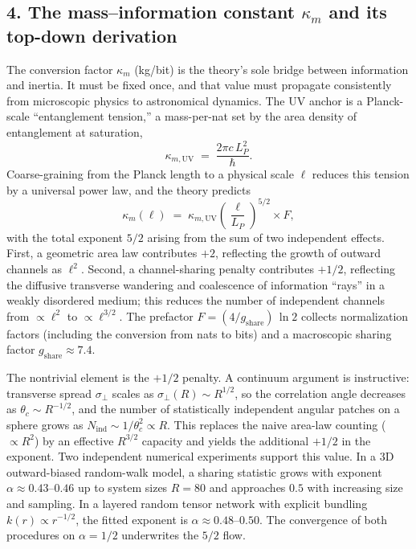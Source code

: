 \documentclass[11pt]{article}
\begin{document}
\subsection*{4. The mass–information constant $\kappa_m$ and its top-down derivation}

The conversion factor $\kappa_m$ (kg/bit) is the theory’s sole bridge between information and inertia. It must be fixed once, and that value must propagate consistently from microscopic physics to astronomical dynamics. The UV anchor is a Planck-scale “entanglement tension,” a mass-per-nat set by the area density of entanglement at saturation,
\begin{equation}
\kappa_{m,\mathrm{UV}} \;=\; \frac{2\pi c\, L_P^2}{\hbar}.
\end{equation}
Coarse-graining from the Planck length to a physical scale $\ell$ reduces this tension by a universal power law, and the theory predicts
\begin{equation}
\kappa_m(\ell) \;=\; \kappa_{m,\mathrm{UV}} \left(\frac{\ell}{L_P}\right)^{5/2} \times F,
\end{equation}
with the total exponent $5/2$ arising from the sum of two independent effects. First, a geometric area law contributes $+2$, reflecting the growth of outward channels as $\ell^2$. Second, a channel-sharing penalty contributes $+1/2$, reflecting the diffusive transverse wandering and coalescence of information “rays” in a weakly disordered medium; this reduces the number of independent channels from $\propto \ell^2$ to $\propto \ell^{3/2}$. The prefactor $F = (4 / g_{\mathrm{share}})\, \ln 2$ collects normalization factors (including the conversion from nats to bits) and a macroscopic sharing factor $g_{\mathrm{share}} \approx 7.4$.

The nontrivial element is the $+1/2$ penalty. A continuum argument is instructive: transverse spread $\sigma_\perp$ scales as $\sigma_\perp(R) \sim R^{1/2}$, so the correlation angle decreases as $\theta_c \sim R^{-1/2}$, and the number of statistically independent angular patches on a sphere grows as $N_{\mathrm{ind}} \sim 1/\theta_c^2 \propto R$. This replaces the naive area-law counting ($\propto R^2$) by an effective $R^{3/2}$ capacity and yields the additional $+1/2$ in the exponent. Two independent numerical experiments support this value. In a 3D outward-biased random-walk model, a sharing statistic grows with exponent $\alpha \approx 0.43$–$0.46$ up to system sizes $R = 80$ and approaches $0.5$ with increasing size and sampling. In a layered random tensor network with explicit bundling $k(r) \propto r^{-1/2}$, the fitted exponent is $\alpha \approx 0.48$–$0.50$. The convergence of both procedures on $\alpha = 1/2$ underwrites the $5/2$ flow.
\end{document}

